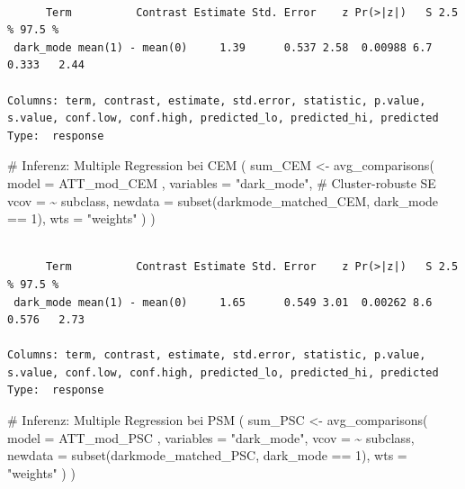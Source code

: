 \documentclass[
  a4paper,
  DIV=11,
  oneside]{scrreprt}
\newenvironment{Shaded}{\begin{snugshade}}{\end{snugshade}}
\newcommand{\AttributeTok}[1]{\textcolor[rgb]{0.40,0.45,0.13}{#1}}
\newcommand{\CommentTok}[1]{\textcolor[rgb]{0.37,0.37,0.37}{#1}}
\newcommand{\DecValTok}[1]{\textcolor[rgb]{0.68,0.00,0.00}{#1}}
\newcommand{\FunctionTok}[1]{\textcolor[rgb]{0.28,0.35,0.67}{#1}}
\newcommand{\NormalTok}[1]{\textcolor[rgb]{0.00,0.23,0.31}{#1}}
\newcommand{\OtherTok}[1]{\textcolor[rgb]{0.00,0.23,0.31}{#1}}
\newcommand{\SpecialCharTok}[1]{\textcolor[rgb]{0.37,0.37,0.37}{#1}}
\newcommand{\StringTok}[1]{\textcolor[rgb]{0.13,0.47,0.30}{#1}}
\begin{document}
\begin{verbatim}

      Term          Contrast Estimate Std. Error    z Pr(>|z|)   S 2.5 % 97.5 %
 dark_mode mean(1) - mean(0)     1.39      0.537 2.58  0.00988 6.7 0.333   2.44

Columns: term, contrast, estimate, std.error, statistic, p.value, s.value, conf.low, conf.high, predicted_lo, predicted_hi, predicted 
Type:  response 
\end{verbatim}

\begin{Shaded}
\begin{Highlighting}[]
\CommentTok{\# Inferenz: Multiple Regression bei CEM}
\NormalTok{(}
\NormalTok{  sum\_CEM }\OtherTok{\textless{}{-}} \FunctionTok{avg\_comparisons}\NormalTok{(}
  \AttributeTok{model =}\NormalTok{ ATT\_mod\_CEM ,}
  \AttributeTok{variables =} \StringTok{"dark\_mode"}\NormalTok{,}
  \CommentTok{\# Cluster{-}robuste SE}
  \AttributeTok{vcov =} \SpecialCharTok{\textasciitilde{}}\NormalTok{ subclass, }
  \AttributeTok{newdata =} \FunctionTok{subset}\NormalTok{(darkmode\_matched\_CEM, dark\_mode }\SpecialCharTok{==} \DecValTok{1}\NormalTok{),}
  \AttributeTok{wts =} \StringTok{"weights"}
\NormalTok{  )}
\NormalTok{)}
\end{Highlighting}
\end{Shaded}

\begin{verbatim}

      Term          Contrast Estimate Std. Error    z Pr(>|z|)   S 2.5 % 97.5 %
 dark_mode mean(1) - mean(0)     1.65      0.549 3.01  0.00262 8.6 0.576   2.73

Columns: term, contrast, estimate, std.error, statistic, p.value, s.value, conf.low, conf.high, predicted_lo, predicted_hi, predicted 
Type:  response 
\end{verbatim}

\begin{Shaded}
\begin{Highlighting}[]
\CommentTok{\# Inferenz: Multiple Regression bei PSM}
\NormalTok{(}
\NormalTok{  sum\_PSC }\OtherTok{\textless{}{-}} \FunctionTok{avg\_comparisons}\NormalTok{(}
    \AttributeTok{model =}\NormalTok{ ATT\_mod\_PSC ,}
    \AttributeTok{variables =} \StringTok{"dark\_mode"}\NormalTok{,}
    \AttributeTok{vcov =} \SpecialCharTok{\textasciitilde{}}\NormalTok{ subclass, }
    \AttributeTok{newdata =} \FunctionTok{subset}\NormalTok{(darkmode\_matched\_PSC, dark\_mode }\SpecialCharTok{==} \DecValTok{1}\NormalTok{),}
    \AttributeTok{wts =} \StringTok{"weights"}
\NormalTok{  )}
\NormalTok{)}
\end{Highlighting}
\end{Shaded}
\end{document}
